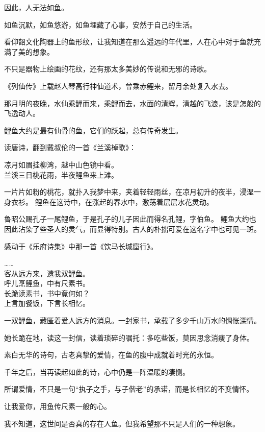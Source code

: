 \documentclass[12pt,a4paper]{article}
\def\blankrev{\vspace{1ex}}									%
\begin{document}
		\blankrev
		因此，人无法如鱼。\par
		如鱼沉默，如鱼悠游，如鱼埋藏了心事，安然于自己的生活。

		\blankrev
		看仰韶文化陶器上的鱼形纹，让我知道在那么遥远的年代里，人在心中对于鱼就充满了美的想象。\par
		不只是器物上绘画的花纹，还有那太多美妙的传说和无邪的诗歌。

		《列仙传》上载赵人琴高行神仙道术，曾乘赤鲤来，留月余处复入水去。\par
		那月明的夜晚，水仙乘鲤而来，乘鲤而去，水面的清辉，清越的飞浪，该是怎般的飞逸动人。

		鲤鱼大约是最有仙骨的鱼，它们的跃起，总有传奇发生。

		读唐诗，翻到戴叔伦的一首《兰溪棹歌》：

		\shortpoem{}{}{}
		凉月如眉挂柳湾，越中山色镜中看。\\
		兰溪三日桃花雨，半夜鲤鱼来上滩。\\
		\endshortpoem

		一片片如粉的桃花，就扑入我梦中来，夹着轻轻雨丝，在凉月初升的夜半，浸湿一身衣衫。
		鲤鱼在这诗中，在涨起的春水中，激荡着层层水花灵动。

		鲁昭公赐孔子一尾鲤鱼，于是孔子的儿子因此而得名孔鲤，字伯鱼。
		鲤鱼大约也因此沾染了些圣人的灵气，而显得特别。古人的朴拙可爱在这名字中也可见一斑。

		感动于《乐府诗集》中那一首《饮马长城窟行》。

		\shortpoem{}{}{}
		…… \\
		客从远方来，遗我双鲤鱼。\\
		呼儿烹鲤鱼，中有尺素书。\\
		长跪读素书，书中竟何如？\\
		上言加餐饭，下言长相忆。\\
		\endshortpoem

		一双鲤鱼，藏匿着爱人远方的消息。一封家书，承载了多少千山万水的惆怅深情。\par
		她长跪在地，读这一封信，读着琐碎的嘱托：多吃些饭，莫因思念消瘦了身体。\par
		素白无华的诗句，古老真挚的爱情，在鱼的腹中成就着时光的永恒。\par
		千年之后，当再读起如此的诗，心中仍是一阵温暖的凄恻。

		\blankrev
		所谓爱情，不只是一句“执子之手，与子偕老”的承诺，而是长相忆的不变情怀。\par
		让我爱你，用鱼传尺素一般的心。

		\blankrev
		我不知道，这世间是否真的存在人鱼。但我希望那不只是人们的一种想象。
\end{document}
